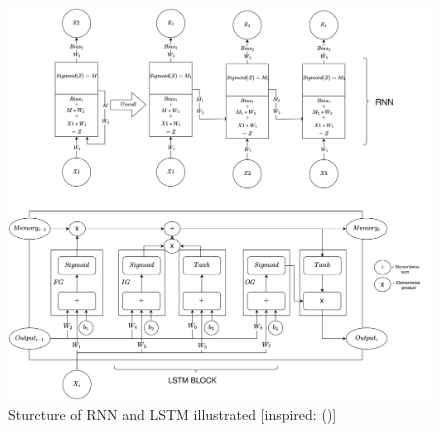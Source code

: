 \begin{figure}[h]
    \centering
    \includegraphics[width=1\linewidth]{template//figures/RNNEXPL_R.png}
    \caption{Sturcture of RNN and LSTM illustrated [inspired: (\cite{googleblog})]}
    \label{RNNEXPL}
\end{figure}

